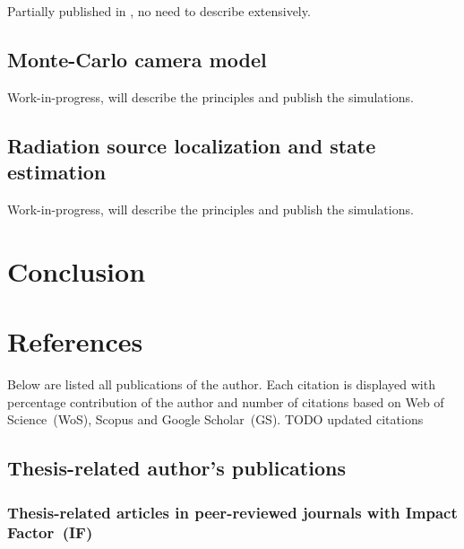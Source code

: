 \documentclass[a4paper,11pt,titlepage,twoside]{book}
\newcommand{\todo}[1]{{\color{red} TODO {#1}}}
\newcommand{\chapternoclear}[1]{
  \begingroup
  \let\cleardoublepage\clearpage
  \chapter{#1}
  \endgroup
}
\begin{document}
Partially published in \cite{baca2019timepix}, no need to describe extensively.

\section{Monte-Carlo camera model}

Work-in-progress, will describe the principles and publish the simulations.

\section{Radiation source localization and state estimation}

Work-in-progress, will describe the principles and publish the simulations.




\chapternoclear{Conclusion}



\appendix
\renewcommand\chaptername{Appendix}

\chapternoclear{References}

Below are listed all publications of the author.
Each citation is displayed with percentage contribution of the author and number of citations based on Web of Science~(WoS), Scopus and Google Scholar~(GS).
\todo{updated citations}

\section{Thesis-related author's publications}

\subsection*{Thesis-related articles in peer-reviewed journals with Impact Factor~(IF)}
\printbibliography[keyword={mine},keyword={phd_related},keyword={journal},keyword={if},heading=none,title={}]
\end{document}
